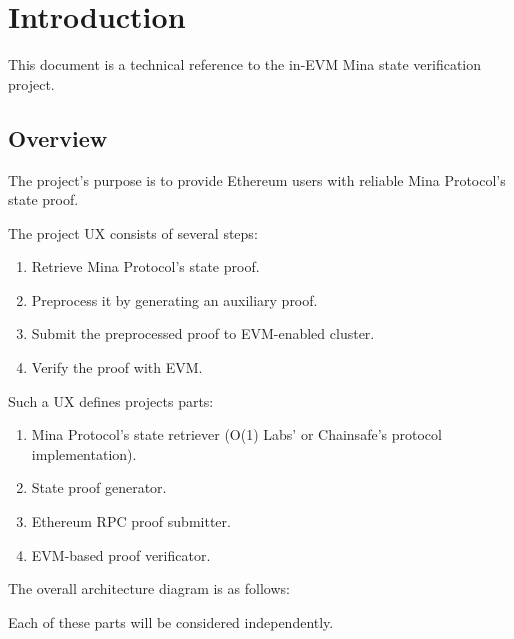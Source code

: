 \chapter{Introduction}

This document is a technical reference to the in-EVM Mina state verification project.

\section{Overview}

The project's purpose is to provide Ethereum users with reliable Mina Protocol's state proof.

The project UX consists of several steps:
\begin{enumerate}
    \item Retrieve Mina Protocol's state proof.
    \item Preprocess it by generating an auxiliary proof.
    \item Submit the preprocessed proof to EVM-enabled cluster.
    \item Verify the proof with EVM.
\end{enumerate}

Such a UX defines projects parts:
\begin{enumerate}
    \item Mina Protocol's state retriever (O(1) Labs' or Chainsafe's protocol implementation).
    \item State proof generator.
    \item Ethereum RPC proof submitter.
    \item EVM-based proof verificator.
\end{enumerate}

The overall architecture diagram is as follows:

Each of these parts will be considered independently.
